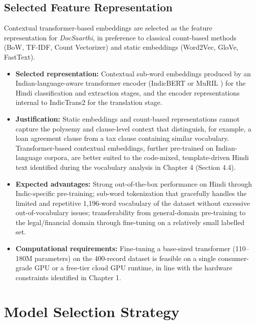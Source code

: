 \subsection{Selected Feature Representation}
\label{sec:feature_selected}

Contextual transformer-based embeddings are selected as the feature representation for \textit{DocSaarthi}, in preference to classical count-based methods (BoW, TF-IDF, Count Vectorizer) and static embeddings (Word2Vec, GloVe, FastText).

\begin{itemize}
    \item \textbf{Selected representation:} Contextual sub-word embeddings produced by an Indian-language-aware transformer encoder (IndicBERT or MuRIL \cite{khanuja2021muril}) for the Hindi classification and extraction stages, and the encoder representations internal to IndicTrans2 \cite{gala2023indictrans2} for the translation stage.
    \item \textbf{Justification:} Static embeddings and count-based representations cannot capture the polysemy and clause-level context that distinguish, for example, a loan agreement clause from a tax clause containing similar vocabulary. Transformer-based contextual embeddings, further pre-trained on Indian-language corpora, are better suited to the code-mixed, template-driven Hindi text identified during the vocabulary analysis in Chapter 4 (Section 4.4).
    \item \textbf{Expected advantages:} Strong out-of-the-box performance on Hindi through Indic-specific pre-training; sub-word tokenization that gracefully handles the limited and repetitive 1,196-word vocabulary of the dataset without excessive out-of-vocabulary issues; transferability from general-domain pre-training to the legal/financial domain through fine-tuning on a relatively small labelled set.
    \item \textbf{Computational requirements:} Fine-tuning a base-sized transformer (110--180M parameters) on the 400-record dataset is feasible on a single consumer-grade GPU or a free-tier cloud GPU runtime, in line with the hardware constraints identified in Chapter 1.
\end{itemize}

\section{Model Selection Strategy}

